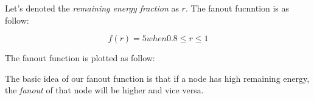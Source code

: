 Let's denoted the \emph{remaining energy fraction} as $r$. The fanout fucnntion is as follow:

\[ f(r) = 5 when 0.8 \leq r \leq 1\]

The fanout function is plotted as follow:


The basic idea of our fanout function is that if a node has high remaining energy, the \emph{fanout} of that node will be higher and vice versa. 



